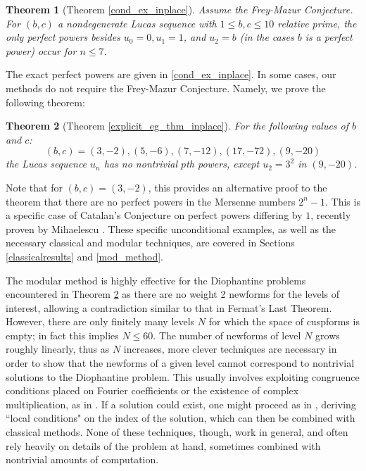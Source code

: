 \documentclass[12pt]{amsart}
\newtheorem{ithm}{Theorem}
\theoremstyle{definition}
\begin{document}
\begin{ithm}[Theorem \ref{cond_ex_inplace}]\label{cond_ex}
Assume the Frey-Mazur Conjecture.  For $(b,c)$ a nondegenerate Lucas sequence with $1 \leq b,c \leq 10$ relative prime, the only perfect powers besides $u_0=0,u_1=1$, and $u_2 = b$ (in the cases $b$ is a perfect power) occur for $n \leq 7$.
\end{ithm}
The exact perfect powers are given in \ref{cond_ex_inplace}.  In some cases, our methods do not require the Frey-Mazur Conjecture.  Namely, we prove the following theorem:

\begin{ithm}[Theorem \ref{explicit_eg_thm_inplace}]\label{explicit_eg_thm}
For the following values of $b$ and $c$:
\begin{equation}\label{examples} (b,c) = (3,-2), (5,-6), (7,-12), (17,-72), (9,-20) \end{equation}
the Lucas sequence $u_n$ has no nontrivial $p$th powers, except $u_2 = 3^2$ in $(9,-20)$.
\end{ithm}

Note that for $(b,c) = (3,-2)$, this provides an alternative proof to the theorem that there are no perfect powers in the Mersenne numbers $2^n - 1$.  This is a specific case of Catalan's Conjecture on perfect powers differing by $1$, recently proven by Mihaelescu \cite{mih04}.  These specific unconditional examples, as well as the necessary classical and modular techniques, are covered in Sections \ref{classicalresults} and \ref{mod_method}.

The modular method is highly effective for the Diophantine problems encountered in Theorem \ref{explicit_eg_thm} as there are no weight 2 newforms for the levels of interest, allowing a contradiction similar to that in Fermat's Last Theorem.  However, there are only finitely many levels $N$ for which the space of cuspforms is empty; in fact this implies $N \leq 60$.  The number of newforms of level $N$ grows roughly linearly, thus as $N$ increases, more clever techniques are necessary in order to show that the newforms of a given level cannot correspond to nontrivial solutions to the Diophantine problem.  This usually involves exploiting congruence conditions placed on Fourier coefficients or the existence of complex multiplication, as in \cite{bennett04}.  If a solution could exist, one might proceed as in \cite{siksek06}, deriving ``local conditions" on the index of the solution, which can then be combined with classical methods.  None of these techniques, though, work in general, and often rely heavily on details of the problem at hand, sometimes combined with nontrivial amounts of computation.
\end{document}
